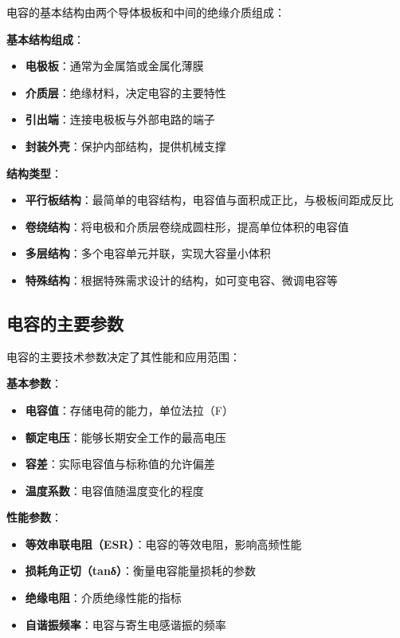 \documentclass[12pt,UTF8]{ctexbook}
\begin{document}
电容的基本结构由两个导体极板和中间的绝缘介质组成：

\textbf{基本结构组成}：
\begin{itemize}[leftmargin=3.5em]
    \item \textbf{电极板}：通常为金属箔或金属化薄膜
    \item \textbf{介质层}：绝缘材料，决定电容的主要特性
    \item \textbf{引出端}：连接电极板与外部电路的端子
    \item \textbf{封装外壳}：保护内部结构，提供机械支撑
\end{itemize}

\textbf{结构类型}：
\begin{itemize}[leftmargin=3.5em]
    \item \textbf{平行板结构}：最简单的电容结构，电容值与面积成正比，与极板间距成反比
    \item \textbf{卷绕结构}：将电极和介质层卷绕成圆柱形，提高单位体积的电容值
    \item \textbf{多层结构}：多个电容单元并联，实现大容量小体积
    \item \textbf{特殊结构}：根据特殊需求设计的结构，如可变电容、微调电容等
\end{itemize}

\subsection{电容的主要参数}

电容的主要技术参数决定了其性能和应用范围：

\textbf{基本参数}：
\begin{itemize}[leftmargin=3.5em]
    \item \textbf{电容值}：存储电荷的能力，单位法拉（F）
    \item \textbf{额定电压}：能够长期安全工作的最高电压
    \item \textbf{容差}：实际电容值与标称值的允许偏差
    \item \textbf{温度系数}：电容值随温度变化的程度
\end{itemize}

\textbf{性能参数}：
\begin{itemize}[leftmargin=3.5em]
    \item \textbf{等效串联电阻（ESR）}：电容的等效电阻，影响高频性能
    \item \textbf{损耗角正切（tanδ）}：衡量电容能量损耗的参数
    \item \textbf{绝缘电阻}：介质绝缘性能的指标
    \item \textbf{自谐振频率}：电容与寄生电感谐振的频率
\end{itemize}
\end{document}
